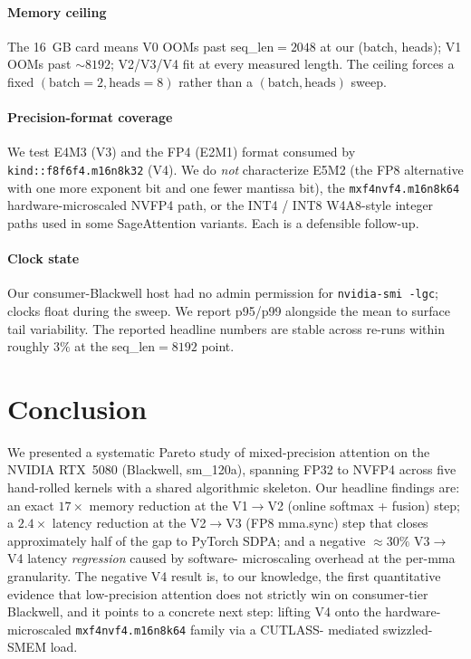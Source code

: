 \documentclass[conference]{IEEEtran}
\begin{document}
\paragraph*{Memory ceiling} The 16~GB card means V0 OOMs past
seq\_len$=2048$ at our (batch, heads); V1 OOMs past $\sim 8192$; V2/V3/V4
fit at every measured length. The ceiling forces a fixed
$(\mathrm{batch} = 2, \mathrm{heads} = 8)$ rather than a
$(\mathrm{batch}, \mathrm{heads})$ sweep.

\paragraph*{Precision-format coverage} We test E4M3 (V3) and the FP4
(E2M1) format consumed by \texttt{kind::f8f6f4.m16n8k32} (V4). We do
\emph{not} characterize E5M2 (the FP8 alternative with one more
exponent bit and one fewer mantissa bit), the
\texttt{mxf4nvf4.m16n8k64} hardware-microscaled NVFP4 path, or the
INT4 / INT8 W4A8-style integer paths used in some SageAttention
variants. Each is a defensible follow-up.

\paragraph*{Clock state} Our consumer-Blackwell host had no admin
permission for \texttt{nvidia-smi -lgc}; clocks float during the
sweep. We report p95/p99 alongside the mean to surface tail
variability. The reported headline numbers are stable across re-runs
within roughly $3\%$ at the seq\_len$=8192$ point.

\section{Conclusion}
\label{sec:conclusion}

We presented a systematic Pareto study of mixed-precision attention on
the NVIDIA RTX~5080 (Blackwell, sm\_120a), spanning FP32 to NVFP4
across five hand-rolled kernels with a shared algorithmic skeleton.
Our headline findings are: an exact $17\times$ memory reduction at
the V1$\to$V2 (online softmax + fusion) step; a $2.4\times$ latency
reduction at the V2$\to$V3 (FP8 mma.sync) step that closes
approximately half of the gap to PyTorch SDPA; and a negative
$\approx 30\%$ V3$\to$V4 latency \emph{regression} caused by software-
microscaling overhead at the per-mma granularity. The negative V4
result is, to our knowledge, the first quantitative evidence that
low-precision attention does not strictly win on consumer-tier
Blackwell, and it points to a concrete next step: lifting V4 onto the
hardware-microscaled \texttt{mxf4nvf4.m16n8k64} family via a CUTLASS-
mediated swizzled-SMEM load.
\end{document}
